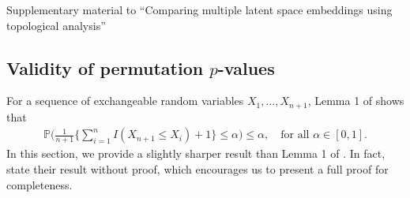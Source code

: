 \documentclass[12pt]{article}
\begin{document}



\newpage
\begin{center}
\LARGE	Supplementary material to ``Comparing multiple latent space embeddings using topological analysis''
\end{center}
\begin{appendices}
\section{Validity of permutation $p$-values} \label{sec: permutation p-value}


For a sequence of exchangeable random variables $X_1,\ldots,X_{n+1}$, Lemma 1 of \cite{romano2005exact} shows that
\begin{align*}
\mathbb{P} \biggl( \frac{1}{n+1} \bigg\{\sum_{i=1}^n I(X_{n+1} \leq X_i)  + 1 \bigg\} \leq \alpha \biggr) \leq \alpha, \quad \text{for all $\alpha \in [0,1]$.}
\end{align*}
In this section, we provide a slightly sharper result than Lemma 1 of \cite{romano2005exact}. In fact, \cite{romano2005exact} state their result without proof, which encourages us to present a full proof for completeness.


\end{appendices}
\end{document}
